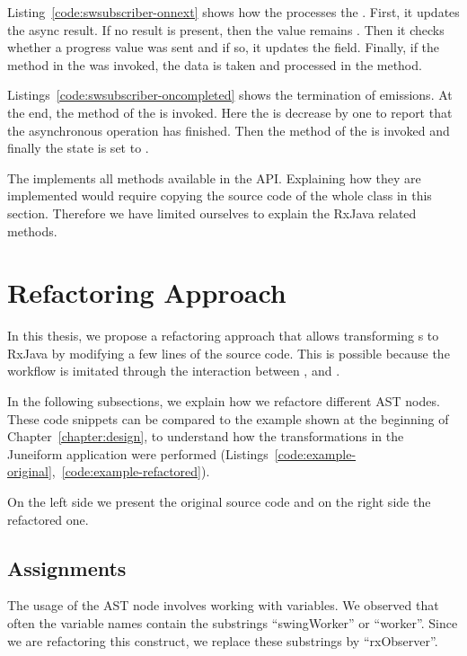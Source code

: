 \documentclass[type=bsc,accentcolor=tud9c]{tudthesis}
\newcommand{\framework}[1]{\textcolor{black!65}{#1}}
\begin{document}


Listing~\ref{code:swsubscriber-onnext} shows how the  processes the . First, it updates the async result. If no result is present, then the value remains . Then it checks whether a progress value was sent and if so, it updates the  field. Finally, if the  method in the  was invoked, the data is taken and processed in the  method.

Listings~\ref{code:swsubscriber-oncompleted} shows the termination of emissions. At the end, the  method of the  is invoked. Here the  is decrease by one to report that the asynchronous operation has finished. Then the  method of the  is invoked and finally the state is set to .



The  implements all methods available in the  API. Explaining how they are implemented would require copying the source code of the whole class in this section. Therefore we have limited ourselves to explain the \framework{RxJava} related methods.


\section{Refactoring Approach}
In this thesis, we propose a refactoring approach that allows transforming s to \framework{RxJava} by modifying a few lines of the source code. This is possible because the  workflow is imitated through the interaction between ,  and .

In the following subsections, we explain how we refactore different AST nodes. These code snippets can be compared to the example shown at the beginning of Chapter~\ref{chapter:design}, to understand how the transformations in the Juneiform application were performed (Listings~\ref{code:example-original},~\ref{code:example-refactored}).

On the left side we present the original source code and on the right side the refactored one.

\subsection{Assignments}
The usage of the AST node  involves working with variables. We observed that often the variable names contain the substrings ``swingWorker'' or     ``worker''. Since we are refactoring this construct, we replace these substrings by ``rxObserver''.
\end{document}
